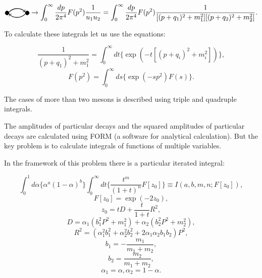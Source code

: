 \documentclass[%
]{ittmm}
\begin{document}
\begin{equation}
        \tikz[baseline=-0.5ex]{
        \filldraw (0, 0) circle (0.1cm);
        \filldraw (1, 0) circle (0.1cm);
        \draw[->, thick] (0.1, 0.05) to[out=45, in=135] (0.9, 0.05);
        \draw[<-, thick] (0.1, -0.05) to[out=-45, in=-135] (0.9, -0.05);
    } \to \int_{0}^{\infty}\frac{dp}{2\pi^4}F(p^2)\frac{1}{u_1u_2} = \int_{0}^{\infty}\frac{dp}{2\pi^4}F(p^2)\frac{1}{[(p + q_1)^2 + m_1^2][(p + q_2)^2 + m_2^2]}.
\end{equation}

To calculate these integrals let us use the equations:

\begin{equation}
    \frac{1}{(p + q_1)^2 + m_1^2} = \int_{0}^{\infty}dt\{\exp(-t[(p + q_i)^2 + m_i^2])\}, 
\end{equation}
\begin{equation}
    F(p^2) = \int_{0}^{\infty}ds\{\exp(-sp^2)F(s)\} .
\end{equation}

The cases of more than two mesons is described using triple and quadruple integrals.

The amplitudes of particular decays and the squared amplitudes of particular decays are calculated using FORM (a software for analytical calculation). But the key problem is to calculate integrals of functions of multiple variables.

In the framework of this problem there is a particular iterated integral:

\begin{equation}
    \label{eq:the-integral}
    \int_{0}^{1}d\alpha\{\alpha^{a}(1 - \alpha)^b\}\int_{0}^{\infty}dt\{\frac{t^m}{(1+t)^n}F[z_{0}]\} \equiv I(a, b, m, n; F[z_{0}]),
\end{equation}
\begin{equation}   
    F[z_0] = \exp(-2z_0),
\end{equation}
\begin{equation} 
    z_0 = tD + \frac{t}{1 + t}R^2,
\end{equation}
\begin{equation}     
    D = \alpha_1(b_1^{2}P^2 + m_1^2) + \alpha_2(b_2^{2}P^2 + m_2^2),
\end{equation}
\begin{equation} 
        R^2 = (\alpha_1^{2}b_1^2 + \alpha_2^{2}b_2^2 + 2\alpha_{1}\alpha_{2}b_{1}b_2)P^2,
\end{equation}
\begin{equation} 
    b_1 = -\frac{m_1}{m_1 + m_2},
\end{equation}
\begin{equation} 
    b_2 = \frac{m_2}{m_1 + m_2},
\end{equation}
\begin{equation}
    \alpha_1 = \alpha, \alpha_2 = 1 - \alpha.
\end{equation}
\end{document}
